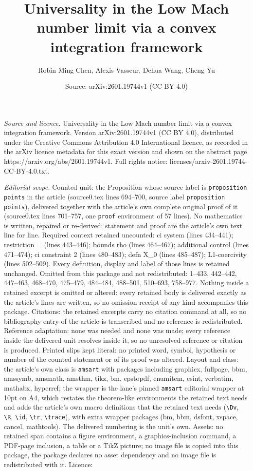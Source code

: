 \documentclass[10pt,a4paper]{amsart}
\title[Universality in the Low Mach number limit via a convex integ]{Universality in the Low Mach number limit via a convex integration framework}
\author{Robin Ming Chen, Alexis Vasseur, Dehua Wang, Cheng Yu}
\date{Source: arXiv:2601.19744v1 (CC BY 4.0)}
\begin{document}
\maketitle

\noindent\emph{Source and licence.} Universality in the Low Mach number limit via a convex integration framework. Version arXiv:2601.19744v1 (CC BY 4.0), distributed under the Creative Commons Attribution 4.0 International licence, as recorded in the arXiv licence metadata for this exact version and shown on the abstract page https://arxiv.org/abs/2601.19744v1. Full rights notice: licenses/arxiv-2601.19744-CC-BY-4.0.txt.\par\smallskip

\noindent\textit{Editorial scope.} Counted unit: the Proposition whose source label is \texttt{proposition points} in the article (source0.tex lines 694--700, source label \texttt{proposition points}), delivered together with the article's own complete original proof of it (source0.tex lines 701--757, one \texttt{proof} environment of 57 lines). No mathematics is written, repaired or re-derived: statement and proof are the article's own text line for line. Required context retained uncounted: ci system (lines 434--441); restriction = (lines 443--446); bounds rho (lines 464--467); additional control (lines 471--474); ci constraint 2 (lines 480--483); defn X\_0 (lines 485--487); L1-coercivity (lines 502--509). Every definition, display and label of those lines is retained unchanged. Omitted from this package and not redistributed: 1--433, 442--442, 447--463, 468--470, 475--479, 484--484, 488--501, 510--693, 758--977. Nothing inside a retained excerpt is omitted or altered: every retained body is delivered exactly as the article's lines are written, so no omission receipt of any kind accompanies this package. Citations: the retained excerpts carry no citation command at all, so no bibliography entry of the article is transcribed and no reference is redistributed. Reference adaptation: none was needed and none was made; every reference inside the delivered unit resolves inside it, so no unresolved reference or citation is produced. Printed slips kept literal: no printed word, symbol, hypothesis or number of the counted statement or of its proof was altered. Layout and class: the article's own class is \texttt{amsart} with packages including graphicx, fullpage, bbm, amssymb, amsmath, amsthm, tikz, bm, epstopdf, enumitem, esint, verbatim, mathabx, hyperref; the wrapper is the lane's pinned \texttt{amsart} editorial wrapper at 10pt on A4, which restates the theorem-like environments the retained text needs and adds the article's own macro definitions that the retained text needs (\texttt{\textbackslash Dv}, \texttt{\textbackslash R}, \texttt{\textbackslash id}, \texttt{\textbackslash tr}, \texttt{\textbackslash trace}), with extra wrapper packages (bm, bbm, dsfont, xspace, cancel, mathtools). The delivered numbering is the unit's own. Assets: no retained span contains a figure environment, a graphics-inclusion command, a PDF-page inclusion, a table or a TikZ picture; no image file is copied into this package, the package declares no asset dependency and no image file is redistributed with it. Licence: 
\end{document}
